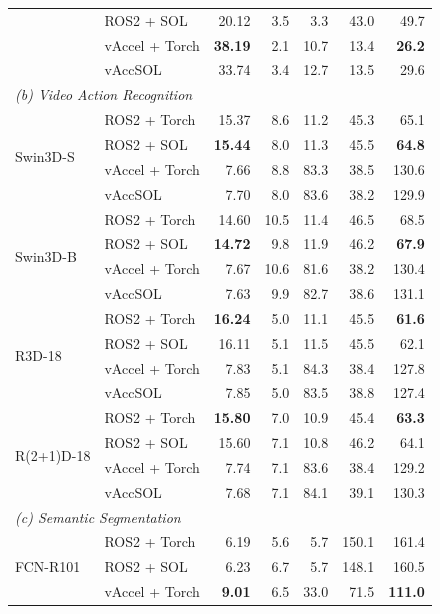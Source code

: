 \begin{table}[t]
\begin{tabular}{llrrrrr}
 & ROS2 + SOL & 20.12 & 3.5 & 3.3 & 43.0 & 49.7 \\
 & vAccel + Torch & \textbf{38.19} & 2.1 & 10.7 & 13.4 & \textbf{26.2} \\
 & vAccSOL & 33.74 & 3.4 & 12.7 & 13.5 & 29.6 \\
\cmidrule(lr){1-7}
\midrule
\multicolumn{7}{l}{\textit{(b) Video Action Recognition}} \\
\midrule
\multirow{4}{*}{Swin3D-S} & ROS2 + Torch & 15.37 & 8.6 & 11.2 & 45.3 & 65.1 \\
 & ROS2 + SOL & \textbf{15.44} & 8.0 & 11.3 & 45.5 & \textbf{64.8} \\
 & vAccel + Torch & 7.66 & 8.8 & 83.3 & 38.5 & 130.6 \\
 & vAccSOL & 7.70 & 8.0 & 83.6 & 38.2 & 129.9 \\
\cmidrule(lr){1-7}
\multirow{4}{*}{Swin3D-B} & ROS2 + Torch & 14.60 & 10.5 & 11.4 & 46.5 & 68.5 \\
 & ROS2 + SOL & \textbf{14.72} & 9.8 & 11.9 & 46.2 & \textbf{67.9} \\
 & vAccel + Torch & 7.67 & 10.6 & 81.6 & 38.2 & 130.4 \\
 & vAccSOL & 7.63 & 9.9 & 82.7 & 38.6 & 131.1 \\
\cmidrule(lr){1-7}
\multirow{4}{*}{R3D-18} & ROS2 + Torch & \textbf{16.24} & 5.0 & 11.1 & 45.5 & \textbf{61.6} \\
 & ROS2 + SOL & 16.11 & 5.1 & 11.5 & 45.5 & 62.1 \\
 & vAccel + Torch & 7.83 & 5.1 & 84.3 & 38.4 & 127.8 \\
 & vAccSOL & 7.85 & 5.0 & 83.5 & 38.8 & 127.4 \\
\cmidrule(lr){1-7}
\multirow{4}{*}{R(2+1)D-18} & ROS2 + Torch & \textbf{15.80} & 7.0 & 10.9 & 45.4 & \textbf{63.3} \\
 & ROS2 + SOL & 15.60 & 7.1 & 10.8 & 46.2 & 64.1 \\
 & vAccel + Torch & 7.74 & 7.1 & 83.6 & 38.4 & 129.2 \\
 & vAccSOL & 7.68 & 7.1 & 84.1 & 39.1 & 130.3 \\
\cmidrule(lr){1-7}
\midrule
\multicolumn{7}{l}{\textit{(c) Semantic Segmentation}} \\
\midrule
\multirow{4}{*}{FCN-R101} & ROS2 + Torch & 6.19 & 5.6 & 5.7 & 150.1 & 161.4 \\
 & ROS2 + SOL & 6.23 & 6.7 & 5.7 & 148.1 & 160.5 \\
 & vAccel + Torch & \textbf{9.01} & 6.5 & 33.0 & 71.5 & \textbf{111.0} \\

\end{tabular}
\end{table}
